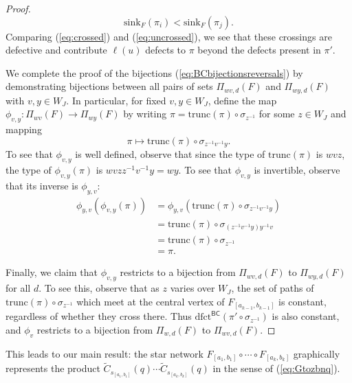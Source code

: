 \documentclass[12pt]{amsart}
\theoremstyle{definition}
\numberwithin{equation}{section}
\newcommand{\wtc}[2]{\widetilde{C}_{#1}(#2)}
\newcommand{\dfctbc}{\mathrm{dfct}^{\msfBC}}
\newcommand{\trunc}{\mathrm{trunc}}
\newcommand{\snk}{\mathrm{sink}}
\newcommand{\msfBC}{\mathsf{BC}}
\begin{document}
\begin{proof}
\begin{equation}\label{eq:uncrossed}
\snk_F(\pi_i) < \snk_F(\pi_j).
\end{equation}
Comparing (\ref{eq:crossed}) and (\ref{eq:uncrossed}), we see
that these crossings are defective and contribute $\ell(u)$ defects to $\pi$ beyond
the defects present in $\pi'$.

We complete the proof of the bijections (\ref{eq:BCbijectionsreversals}) by
demonstrating bijections between all pairs of sets $\Pi_{wv,d}(F)$ and  $\Pi_{wy,d}(F)$ with $v, y \in W_J$. In particular, for fixed $v, y \in W_J$, define the map $\phi_{v,y}: \Pi_{wv}(F) \rightarrow  \Pi_{wy}(F)$ by writing $\pi = \trunc(\pi) \circ \sigma_{z^{-1}}$ for some $z \in W_J$ and mapping
\begin{equation}\label{eq:phivy}
\pi \mapsto \mathrm{trunc}(\pi) \circ \sigma_{z^{-1}v^{-1}y}.
\end{equation}
To see that $\phi_{v,y}$ is well defined, observe that since the type of $\trunc(\pi)$ is $wvz$, the type of $\phi_{v,y}(\pi)$ is $wvz z^{-1}v^{-1}y = wy$.  To see that $\phi_{v,y}$ is invertible, observe that its inverse is $\phi_{y,v}$:
\begin{equation*}
\begin{aligned}
    \phi_{y,v}(\phi_{v,y}(\pi)) &= \phi_{y,v}(\trunc(\pi) \circ \sigma_{z^{-1}v^{-1}y})\\
    &= \trunc(\pi) \circ \sigma_{(z^{-1}v^{-1}y) y^{-1}v} \\
    &= \trunc(\pi) \circ \sigma_{z^{-1}}\\
    &= \pi.
    \end{aligned}
\end{equation*}

Finally, we claim that $\phi_{v,y}$ restricts to a bijection from $\Pi_{wv,d}(F)$ to $\Pi_{wy,d}(F)$ for all $d$. To see this, observe that as $z$ varies over $W_J$, the set of paths of $\trunc(\pi) \circ \sigma_{z^{-1}}$ which meet at the central vertex of $F_{[a_{k-1},b_{k-1}]}$ is constant, regardless of whether they cross there. Thus $\dfctbc(\pi' \circ \sigma_{z^{-1}})$ is also constant, and $\phi_v$ restricts to a bijection from $\Pi_{w,d}(F)$ to $\Pi_{wv,d}(F)$.
  \end{proof}

This leads to our main result: 
the star network $F_{[a_1,b_1]} \circ \cdots \circ F_{[a_k,b_k]}$ graphically represents the product $\wtc{s_{[a_1,b_1]}}q \cdots \wtc{s_{[a_k,b_k]}}q$ in the sense of (\ref{eq:Gtozbnq}).
 
\end{document}
